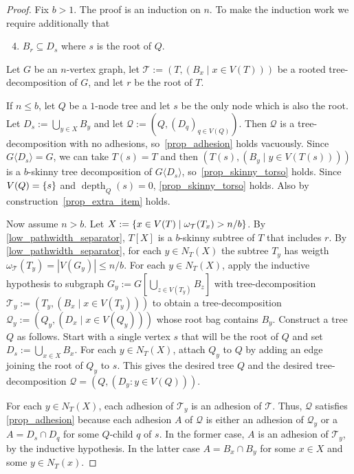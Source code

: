 \documentclass{patmorin}
\renewcommand{\le}{\leqslant}
\newcommand{\torso}[2]{{#1}\langle{#2}\rangle}
\DeclareMathOperator{\depth}{depth}
\DeclarePairedDelimiter{\set}{\{}{\}}
\newcommand{\calQ}{\mathcal{Q}}
\newcommand{\calT}{\mathcal{T}}
\begin{document}
  \begin{proof}
    Fix $b>1$. 
    The proof is an induction on $n$. 
    To make the induction work we require additionally that 
    \begin{enumerate}[nosep,nolistsep,label=(\alph*)]
    \setcounter{enumi}{3}
    \item\label{prop_extra_item} $B_r \subseteq D_s$ where $s$ is the root of $Q$.
    \end{enumerate}
    Let $G$ be an $n$-vertex graph, let $\calT:=(T,(B_x\mid x\in V(T)))$ be a rooted tree-decomposition of $G$, and let $r$ be the root of $T$. 

If $n\le b$, let $Q$ be a $1$-node tree and let $s$ be the only node which is also the root. 
Let $D_s:=\bigcup_{y\in X} B_y$ and let $\calQ:=(Q,(D_q)_{q\in V(Q)})$. 
Then $\calQ$ is a tree-decomposition with no adhesions, so~\ref{prop_adhesion} holds vacuously. 
Since $\torso{G}{D_s}=G$, we can take $T(s)=T$ and then $(T(s),(B_y\mid y\in V(T(s))))$ is a $b$-skinny tree decomposition of $\torso{G}{D_s}$, 
so~\ref{prop_skinny_torso} holds. 
Since $V(Q)=\set{s}$ and $\depth_Q(s)=0$, \ref{prop_skinny_torso}  holds. 
Also by construction~\ref{prop_extra_item} holds. 

    Now assume $n> b$. 
    Let $X:=\set{x\in V(T)\mid  \omega_\calT(T_x)>n/b}$. 
    By \cref{low_pathwidth_separator}, $T[X]$ is a $b$-skinny subtree of $T$ that includes $r$.  
    By \cref{low_pathwidth_separator}, for each $y\in N_T(X)$ the subtree $T_y$ has weigth $\omega_\calT(T_y)=|V(G_y)|\le n/b$. For each $y\in N_T(X)$, apply the inductive hypothesis to subgraph $G_y:=G[\bigcup_{z\in V(T_y)} B_z]$ with tree-decomposition $\calT_y:=(T_y, (B_x\mid x\in V(T_y)))$ to obtain a tree-decomposition $\calQ_{y}:=(Q_y,(D_x \mid x\in V(Q_y)))$ whose root bag contains $B_y$. 
    Construct a tree $Q$ as follows. 
    Start with a single vertex $s$ that will be the root of $Q$ and set $D_s:=\bigcup_{x\in X} B_x$. 
    For each $y\in N_T(X)$, attach $Q_y$ to $Q$ by adding an edge joining the root of $Q_y$ to $s$. 
    This gives the desired tree $Q$ and the desired tree-decomposition $\calQ=(Q,(D_y:y\in V(Q)))$.

    For each $y\in N_T(X)$, each adhesion of $\calT_y$ is an adhesion of $\calT$.
    Thus, $\calQ$ satisfies \ref{prop_adhesion} because each adhesion $A$ of $\calQ$ is either an adhesion of $\calQ_y$ or a $A=D_s\cap D_{q}$ for some $Q$-child $q$ of $s$.  In the former case, $A$ is an adhesion of $\calT_y$, by the inductive hypothesis. In the latter case $A=B_x\cap B_y$ for some $x\in X$ and some $y\in N_T(x)$.
    

\end{proof}
\end{document}
